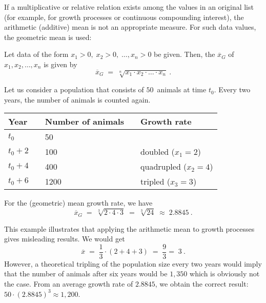 \begin{MIntro}
If a multiplicative or relative relation exists among the values in an original list (for example, 
for growth processes or continuous compounding interest), the arithmetic (additive) mean is not an 
appropriate measure. For such data values, the geometric mean is used:

\begin{MInfo}
Let data of the form $x_{1}>0,\;x_{2}>0,\;\ldots ,x_{n}>0$ be given. 
Then, the  $\overline{x}_{G}$ of $x_{1},x_{2},\ldots ,x_{n}$ is given by
$$
\overline{x}_{G}\; =\; \sqrt[n]{x_{1}\cdot x_{2}\cdot \ldots \cdot x_{n}}\: .
$$
\end{MInfo}

\begin{MExample}
Let us consider a population that consists of $50$~animals at time $t_{0}$. Every two years, the number 
of animals is counted again.

\begin{center}
\begin{tabular}{|l|l|l|l|l|}
\hline
Year & & Number of animals & & Growth rate \\ \hline
$t_{0}$ & & 50 \\ \hline
$t_{0}+2$ & & 100 & & doubled ($x_{1}=2$)\\ \hline
$t_{0}+4$ & & 400 & & quadrupled  ($x_{2}=4$)\\ \hline
$t_{0}+6$ & & 1200 & & tripled ($x_{3}=3$)\\ \hline
\end{tabular}
\end{center}

For the (geometric) mean growth rate, we have
$$
\overline{x}_G\; =\; \sqrt[3]{2\cdot 4\cdot 3}\; =\; \sqrt[3]{24}\; \approx\; 2.8845\: .
$$
\end{MExample}

This example illustrates that applying the arithmetic mean to growth processes gives misleading results. We would get
$$
\overline{x}\; =\;\frac{1}{3}\cdot (2+4+3)\; =\; \frac{9}{3}=\; 3\: .
$$
However, a theoretical tripling of the population size every two years would imply 
that the number of animals after six years would be $1{,}350$ which is obviously not the case. 
From an average growth rate of $2.8845$, we obtain the correct result: $50\cdot (2.8845)^{3}\approx 1{,}200$.


\end{MIntro}

